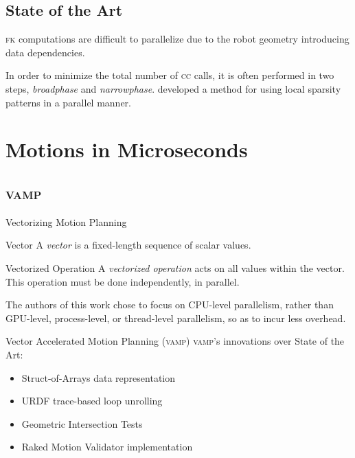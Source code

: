 \documentclass{beamer}
\begin{document}
\subsection{State of the Art}

\begin{frame}
\textsc{fk} computations are difficult to parallelize due to the robot geometry introducing data dependencies.

In order to minimize the total number of \textsc{cc} calls, it is often performed in two steps, \textit{broadphase} and \textit{narrowphase}. \cite{paper:eemp} developed a method for using local sparsity patterns in a parallel manner.
\end{frame}

\section{Motions in Microseconds}

\subsection{\textsc{vamp}}


\begin{frame}{Vectorizing Motion Planning}
\pause
\begin{block}{Vector}
A \textit{vector} is a fixed-length sequence of scalar values.
\end{block}

\begin{block}{Vectorized Operation}
A \textit{vectorized operation} acts on all values within the vector. This operation must be done independently, in parallel.
\end{block}

\pause
The authors of this work chose to focus on CPU-level parallelism, rather than GPU-level, process-level, or thread-level parallelism, so as to incur less overhead.
\end{frame}

\begin{frame}{Vector Accelerated Motion Planning (\textsc{vamp})}
\pause
\textsc{vamp}'s innovations over State of the Art:
\begin{itemize}
\item Struct-of-Arrays data representation
\item URDF trace-based loop unrolling
\item Geometric Intersection Tests
\item Raked Motion Validator implementation
\end{itemize}
\end{frame}
\end{document}
